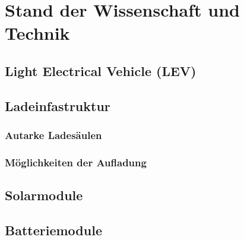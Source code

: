 
\chapter{Stand der Wissenschaft und Technik}
\label{sec:StandDerWissenschaftUndTechnik}


\section{Light Electrical Vehicle (LEV)}
\label{sec:LightElectricalVehicleLEV}


\section{Ladeinfastruktur}
\label{sec:Ladeinfastruktur}


\subsection{Autarke Ladesäulen}
\label{sec:AutarkeLadesäulen}


\subsection{Möglichkeiten der Aufladung}
\label{sec:MöglichkeitenDerAufladung}


\section{Solarmodule}
\label{sec:Solarmodule}


\section{Batteriemodule}
\label{sec:Batteriemodule}


